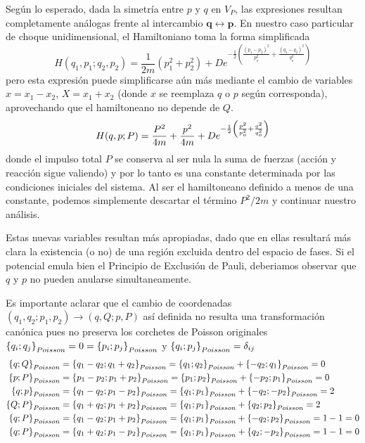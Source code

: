 Según lo esperado, dada la simetría entre $p$ y $q$ en $V_P$, las expresiones resultan completamente análogas frente al intercambio $\mathbf{q}\leftrightarrow\mathbf{p}$. 
En nuestro caso particular de choque unidimensional, el Hamiltoniano toma la forma simplificada
\[ H(q_1, p_1; q_2, p_2) = \frac{1}{2m}\left( p_1^2 +p_2^2\right) + De^{-\frac{1}{2}\left(\frac{(p_1-p_2)^2}{p_o^2} + \frac{(q_1 - q_2)^2}{q_o^2}\right)} \]
pero esta expresión puede simplificarse aún más mediante el cambio de variables $x = x_1 - x_2$, $X = x_1 + x_2$ (donde $x$ se reemplaza $q$ o $p$ según corresponda), aprovechando que el hamiltoneano no depende de $Q$.
\begin{equation}{\label{eq:hamiltoniano_1D}}
H(q, p; P) = \frac{P^2}{4m} +\frac{p^2}{4m} + De^{-\frac{1}{2}\left(\frac{p^2}{p_o^2} + \frac{q^2}{q_o^2}\right)}
\end{equation}
donde el impulso total $P$ se conserva al ser nula la suma de fuerzas (acción y reacción sigue valiendo) y por lo tanto es una constante determinada por las condiciones iniciales del sistema.
Al ser el hamiltoneano definido a menos de una constante, podemos simplemente descartar el término $P^2/2m$ y continuar nuestro análisis.

Estas nuevas variables resultan más apropiadas, dado que en ellas resultará más clara la existencia (o no) de una región excluida dentro del espacio de fases.
Si el potencial emula bien el Principio de Exclusión de Pauli, deberiamos observar que $q$ y $p$ no pueden anularse simultaneamente. 

Es importante aclarar que el cambio de coordenadas $(q_1,q_2;p_1,p_2)\rightarrow (q,Q;p,P)$ así definida no resulta una transformación canónica pues no preserva los corchetes de Poisson originales $\left\{q_i; q_j \right\}_{Poisson} = 0 = \left\{p_i; p_j \right\}_{Poisson}$ y $\left\{q_i; p_j \right\}_{Poisson} = \delta_{ij}$
\begin{align*}
\left\{q; Q \right\}_{Poisson} &= \left\{q_1-q_2; q_1+q_2 \right\}_{Poisson} =  \left\{q_1; q_2 \right\}_{Poisson} + \left\{-q_2; q_1 \right\}_{Poisson} = 0 \\
\left\{p; P \right\}_{Poisson} &= \left\{p_1-p_2; p_1+p_2 \right\}_{Poisson} = \left\{p_1; p_2 \right\}_{Poisson} + \left\{-p_2; p_1 \right\}_{Poisson} = 0 \\
\left\{q; p \right\}_{Poisson} &= \left\{q_1-q_2; p_1-p_2 \right\}_{Poisson} =  \left\{q_1; p_1 \right\}_{Poisson} + \left\{-q_2; -p_2 \right\}_{Poisson} = 2 \\
\left\{Q; P \right\}_{Poisson} &= \left\{q_1+q_2; p_1+p_2 \right\}_{Poisson} =  \left\{q_1; p_1 \right\}_{Poisson} + \left\{q_2; p_2 \right\}_{Poisson} = 2 \\
\left\{q; P \right\}_{Poisson} &= \left\{q_1-q_2; p_1+p_2 \right\}_{Poisson} = \left\{q_1; p_1 \right\}_{Poisson} + \left\{-q_2; p_2 \right\}_{Poisson} = 1 - 1 = 0 \\
\left\{q; P \right\}_{Poisson} &= \left\{q_1+q_2; p_1-p_2 \right\}_{Poisson} = \left\{q_1; p_1 \right\}_{Poisson} + \left\{q_2; -p_2 \right\}_{Poisson} = 1 - 1 = 0
\end{align*}

